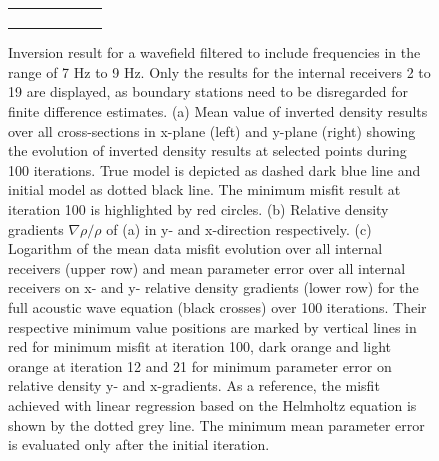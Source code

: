 \documentclass[]{article}
\begin{document}
\begin{figure}[H]
\begin{tabular}[c]{c}
\begin{subfigure}[c]{0.7\linewidth}
		\end{subfigure}
		\end{tabular}
	\caption{Inversion result for a wavefield filtered to include frequencies in the range of 7 Hz to 9 Hz. Only the results for the internal receivers 2 to 19 are displayed, as boundary stations need to be disregarded for finite difference estimates. (a) Mean value of inverted density results over all cross-sections in x-plane (left) and y-plane (right) showing the evolution of inverted density results at selected points during 100 iterations. True model is depicted as dashed dark blue line and initial model as dotted black line. The minimum misfit result at iteration 100 is highlighted by red circles. (b) Relative density gradients $\nabla \rho/\rho$ of  (a) in y- and x-direction respectively. (c) Logarithm of the mean data misfit evolution over all internal receivers (upper row) and mean parameter error over all internal receivers on x- and y- relative density gradients (lower row) for the full acoustic wave equation (black crosses) over 100 iterations. Their respective minimum value positions are marked by vertical lines in red for minimum misfit at iteration 100, dark orange and light orange at iteration 12 and 21 for minimum parameter error on relative density y- and x-gradients. As a reference, the misfit achieved with linear regression based on the Helmholtz equation is shown by the dotted grey line. The minimum mean parameter error is evaluated only after the initial iteration.}
	\label{fig:rho_est_8Hz}
	\end{figure}
	
\end{document}
